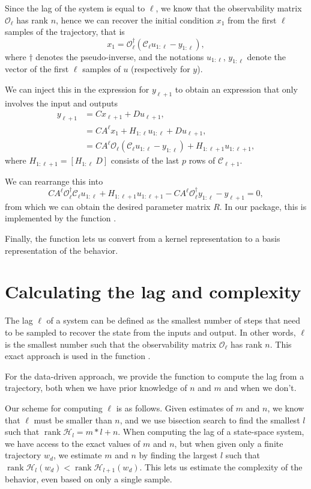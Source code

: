 \documentclass[11pt]{article}
\def\rank{\operatorname{rank}}
\begin{document}
Since the lag of the system is equal to $\ell$, we know that the observability matrix $\mathscr{O}_\ell$ has rank $n$, hence we can recover the initial condition $x_1$ from the first $\ell$ samples of the trajectory, that is
$$ x_1 = \mathscr{O}_\ell^\dagger (\mathscr{C}_\ell u_{1:\ell} - y_{1:\ell}), $$
where $\dagger$ denotes the pseudo-inverse, and the notations $u_{1:\ell}$, $y_{1:\ell}$ denote the vector of the first $\ell$ samples of $u$ (respectively for $y$). 

We can inject this in the expression for $y_{\ell+1}$ to obtain an expression that only involves the input and outputs
\begin{align*}
  y_{\ell+1} &= Cx_{\ell+1} + Du_{\ell+1}, \\
   &= CA^\ell x_1 + H_{1:\ell} u_{1:\ell} + Du_{\ell+1}, \\
   &= CA^\ell \mathscr{O}_\ell (\mathscr{C}_\ell u_{1:\ell} - y_{1:\ell}) + H_{1:\ell+1} u_{1:\ell+1},
\end{align*}
where $H_{1:\ell+1} = [H_{1:\ell} ~D]$ consists of the last $p$ rows of $\mathscr{C}_{\ell+1}$.

We can rearrange this into 
$$ CA^\ell \mathscr{O}_\ell^\dagger \mathscr{C}_\ell u_{1:\ell} + H_{1:\ell+1} u_{1:\ell+1} - CA^\ell \mathscr{O}_\ell^\dagger y_{1:\ell} -y_{\ell+1} = 0,$$
from which we can obtain the desired parameter matrix $R$. In our package, this is implemented by the function .

Finally, the function  lets us convert from a kernel representation to a basis representation of the behavior.

\section{Calculating the lag and complexity}
The lag $\ell$ of a system can be defined as the smallest number of steps that need to be sampled to recover the state from the inputs and output. In other words, $\ell$ is the smallest number such that the observability matrix $\mathscr{O}_\ell$ has rank $n$. This exact approach is used in the function .

For the data-driven approach, we provide the function  to compute the lag from a trajectory, both when we have prior knowledge of $n$ and $m$ and when we don't.

Our scheme for computing $\ell$ is as follows. Given estimates of $m$ and $n$, we know that $\ell$ must be smaller than $n$, and we use bisection search to find the smallest $l$ such that $\rank \mathscr{H}_{l} = m*l + n$. When computing the lag of a state-space system, we have access to the exact values of $m$ and $n$, but when given only a finite trajectory $w_d$, we estimate $m$ and $n$ by finding the largest $l$ such that $\rank \mathscr{H}_l (w_d) < \rank \mathscr{H}_{l+1}(w_d)$. This lets us estimate the complexity of the behavior, even based on only a single sample.
\end{document}
